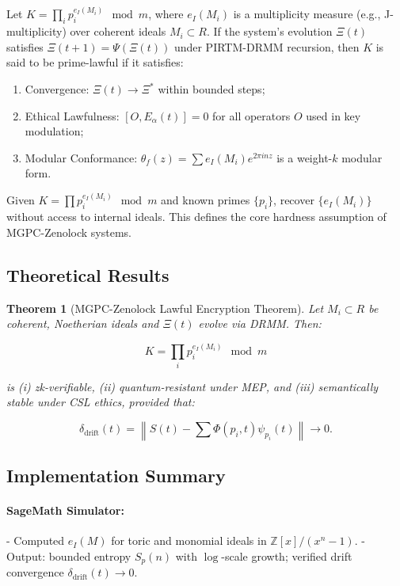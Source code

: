 \documentclass{article}
\theoremstyle{plain}
\newtheorem{theorem}{Theorem}
\begin{document}
\begin{axiom}
Let $K = \prod_{i} p_i^{e_I(M_i)} \mod m$, where $e_I(M_i)$ is a multiplicity measure (e.g., J-multiplicity) over coherent ideals $M_i \subset R$. If the system's evolution $\Xi(t)$ satisfies $\Xi(t+1) = \Psi(\Xi(t))$ under PIRTM-DRMM recursion, then $K$ is said to be prime-lawful if it satisfies:

\begin{enumerate}
    \item Convergence: $\Xi(t) \to \Xi^*$ within bounded steps;
    \item Ethical Lawfulness: $[O, E_\alpha(t)] = 0$ for all operators $O$ used in key modulation;
    \item Modular Conformance: $\theta_f(z) = \sum e_I(M_i) e^{2\pi i n z}$ is a weight-$k$ modular form.
\end{enumerate}
\end{axiom}

\begin{definition}
Given $K = \prod p_i^{e_I(M_i)} \mod m$ and known primes $\{p_i\}$, recover $\{e_I(M_i)\}$ without access to internal ideals. This defines the core hardness assumption of MGPC-Zenolock systems.
\end{definition}

\subsection{Theoretical Results}

\begin{theorem}[MGPC-Zenolock Lawful Encryption Theorem]
Let $M_i \subset R$ be coherent, Noetherian ideals and $\Xi(t)$ evolve via DRMM. Then:

\[
K = \prod_i p_i^{e_I(M_i)} \mod m
\]

is (i) zk-verifiable, (ii) quantum-resistant under MEP, and (iii) semantically stable under CSL ethics, provided that:

\[
\delta_{\text{drift}}(t) = \left\| S(t) - \sum \Phi(p_i,t)\psi_{p_i}(t) \right\| \to 0.
\]

\end{theorem}

\subsection{Implementation Summary}

\paragraph{SageMath Simulator:}
- Computed $e_I(M)$ for toric and monomial ideals in $\mathbb{Z}[x]/(x^n - 1)$.
- Output: bounded entropy $S_p(n)$ with $\log$-scale growth; verified drift convergence $\delta_{\text{drift}}(t) \to 0$.
\end{document}
